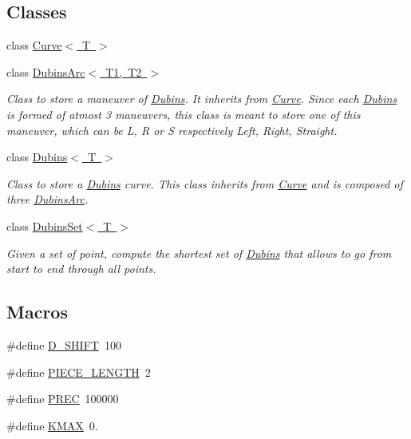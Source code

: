 \subsection*{Classes}
\begin{DoxyCompactItemize}
\item 
class \mbox{\hyperlink{class_curve}{Curve$<$ T $>$}}
\item 
class \mbox{\hyperlink{class_dubins_arc}{Dubins\+Arc$<$ T1, T2 $>$}}
\begin{DoxyCompactList}\small\item\em Class to store a maneuver of \mbox{\hyperlink{class_dubins}{Dubins}}. It inherits from {\ttfamily \mbox{\hyperlink{class_curve}{Curve}}}. Since each \mbox{\hyperlink{class_dubins}{Dubins}} is formed of atmost 3 maneuvers, this class is meant to store one of this maneuver, which can be L, R or S respectively Left, Right, Straight. \end{DoxyCompactList}\item 
class \mbox{\hyperlink{class_dubins}{Dubins$<$ T $>$}}
\begin{DoxyCompactList}\small\item\em Class to store a \mbox{\hyperlink{class_dubins}{Dubins}} curve. This class inherits from {\ttfamily \mbox{\hyperlink{class_curve}{Curve}}} and is composed of three {\ttfamily \mbox{\hyperlink{class_dubins_arc}{Dubins\+Arc}}}. \end{DoxyCompactList}\item 
class \mbox{\hyperlink{class_dubins_set}{Dubins\+Set$<$ T $>$}}
\begin{DoxyCompactList}\small\item\em Given a set of point, compute the shortest set of \mbox{\hyperlink{class_dubins}{Dubins}} that allows to go from start to end through all points. \end{DoxyCompactList}\end{DoxyCompactItemize}
\subsection*{Macros}
\begin{DoxyCompactItemize}
\item 
\#define \mbox{\hyperlink{dubins_8hh_ad18a9640dcab4f84a2b1710a78bf813e}{D\+\_\+\+S\+H\+I\+FT}}~100
\item 
\#define \mbox{\hyperlink{dubins_8hh_a5b2500ca93a5100f73dc442d3cfea7d4}{P\+I\+E\+C\+E\+\_\+\+L\+E\+N\+G\+TH}}~2
\item 
\#define \mbox{\hyperlink{dubins_8hh_a2bda1a81ce3474772a8a1f165e54516e}{P\+R\+EC}}~100000
\item 
\#define \mbox{\hyperlink{dubins_8hh_a940b85a83458e94519f2685b33ddd276}{K\+M\+AX}}~0.
\end{DoxyCompactItemize}
